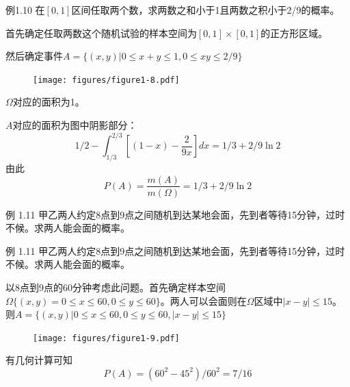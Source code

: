 \documentclass{beamer}
\begin{document}
	\begin{frame}
		例1.10 在$[0, 1]$区间任取两个数，求两数之和小于1且两数之积小于2/9的概率。
		
		首先确定任取两数这个随机试验的样本空间为$[0, 1] \times [0, 1]$的正方形区域。
		
		然后确定事件$A = \{(x, y) | 0 \leq x + y \leq 1, 0 \leq xy \leq 2 / 9\}$
	\end{frame}
	
	\begin{frame}
		\begin{figure}[H]
			\centering
			\texttt{[image: figures/figure1-8.pdf]}
		\end{figure}
	\end{frame}
	
	\begin{frame}
		$\Omega$对应的面积为1。
		
		$A$对应的面积为图中阴影部分：
		\[
		1 / 2 - \int_{1 / 3}^{2 / 3}[(1 - x) - \frac{2}{9x}]dx = 1 / 3 + 2 / 9 \ln 2
		\]
		由此
		\[
		P(A) = \frac{m(A)}{m(\Omega)} = 1 / 3 + 2 / 9 \ln 2
		\]
	\end{frame}
	
	\begin{frame}
		例 1.11 甲乙两人约定8点到9点之间随机到达某地会面，先到者等待15分钟，过时不候。求两人能会面的概率。
		
	\end{frame}
	
	\begin{frame}
		例 1.11 甲乙两人约定8点到9点之间随机到达某地会面，先到者等待15分钟，过时不候。求两人能会面的概率。
		
		
		以8点到9点的60分钟考虑此问题。首先确定样本空间$\Omega\{(x, y) = 0 \leq x \leq 60, 0\leq y \leq 60\}$。两人可以会面则在$\Omega$区域中$|x - y| \leq 15$。则$A = \{(x, y) | 0 \leq x \leq 60, 0\leq y \leq 60, |x - y| \leq 15\}$
	\end{frame}
	
	\begin{frame}
		\begin{figure}
			\centering
			\texttt{[image: figures/figure1-9.pdf]}
		\end{figure}
	\end{frame}
	
	\begin{frame}
		有几何计算可知
		\[
		P(A) = (60 ^ 2 - 45 ^ 2) / 60 ^ 2 = 7 / 16
		\]
	\end{frame}
	
\end{document}
